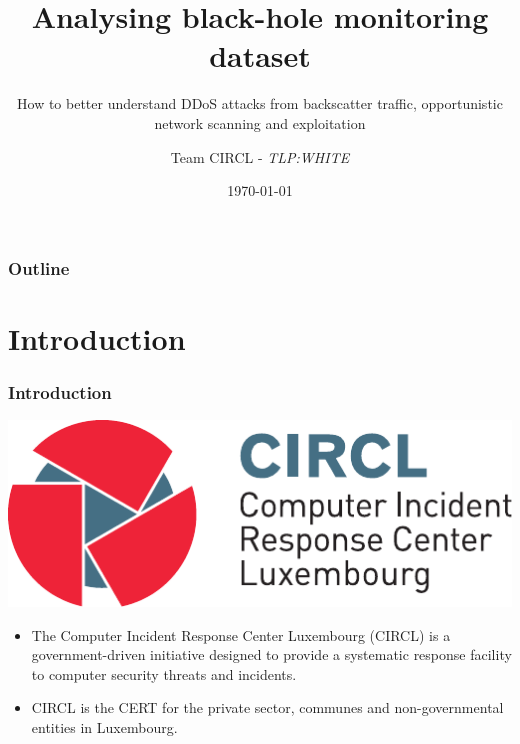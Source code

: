 \documentclass{beamer}
\author{Team CIRCL - \emph{TLP:WHITE}}
\subtitle{How to better understand DDoS attacks from backscatter traffic, opportunistic network scanning and exploitation}
\title{Analysing black-hole monitoring dataset}
\institute{CIRCL}
\date{\today}
\begin{document}
\begin{frame}[t,plain]
\titlepage
\end{frame}

\begin{frame}
    \frametitle{Outline}
    \tableofcontents
\end{frame}

\section{Introduction}

\begin{frame}
 \frametitle{Introduction}
 \includegraphics[scale=0.5]{logo-circl.pdf}
 \begin{itemize}
 \item The Computer Incident Response Center Luxembourg (CIRCL) is a government-driven initiative designed to provide a systematic response facility to computer security threats and incidents.
 \item CIRCL is the CERT for the private sector, communes and non-governmental entities in Luxembourg.
 \end{itemize}
\end{frame}
\end{document}

